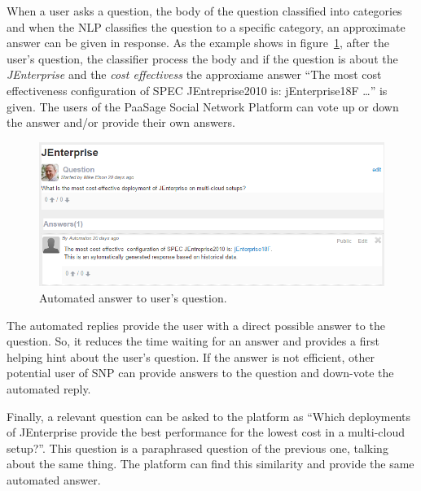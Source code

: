 When a user asks a question, the body of the question classified into categories and when the NLP classifies the question to a specific category, an approximate answer can be given in response. As the example shows in figure~\ref{fig:nlp_example}, after the user's question, the classifier process the body and if the question is about the {\it JEnterprise} and the {\it cost effectivess} the approxiame answer ``The most cost effectiveness configuration of SPEC JEntreprise2010 is: jEnterprise18F \ldots'' is given. The users of the PaaSage Social Network Platform can vote up or down the answer and/or provide their own answers.

\begin{figure}
  \centering
  \includegraphics[scale=0.6]{./fig/nlp_example.png}
  \caption{Automated answer to user's question.}
  \label{fig:nlp_example}
\end{figure}

The automated replies provide the user with a direct possible answer to the question. So, it reduces the time waiting for an answer and provides a first helping hint about the user's question. If the answer is not efficient, other potential user of SNP can provide answers to the question and down-vote the automated reply.

Finally, a relevant question can be asked to the platform as ``Which deployments of JEnterprise provide the best performance for the lowest cost in a multi-cloud setup?''. This question is a paraphrased question of the previous one, talking about the same thing. The platform can find this similarity and provide the same automated answer.

